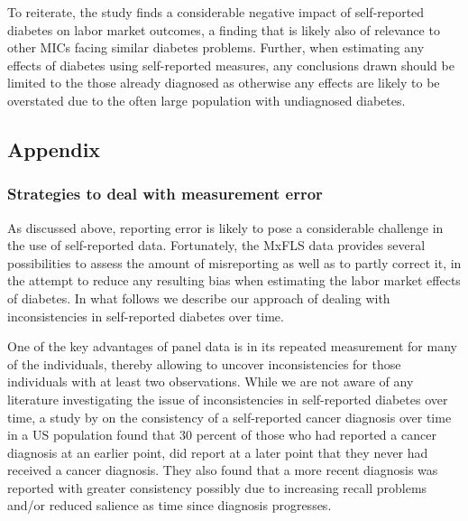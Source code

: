 \documentclass[12pt,english,british]{article}
\begin{document}
To reiterate, the study finds a considerable negative impact of self-reported diabetes on labor market outcomes, a finding that is likely also of relevance to other \ac{MICs} facing similar diabetes problems. Further, when estimating any effects of diabetes using self-reported measures, any conclusions drawn should be limited to the those already diagnosed as otherwise any effects are likely to be overstated due to the often large population with undiagnosed diabetes.


\begin{appendix}
\clearpage


\part*{Appendix}

\section{Strategies to deal with measurement error}

As discussed above, reporting error is likely to pose a considerable
challenge in the use of self-reported data. Fortunately, the \ac{MxFLS}
data provides several possibilities to assess the amount of misreporting
as well as to partly correct it, in the attempt to reduce any resulting
bias when estimating the labor market effects of diabetes. In what
follows we describe our approach of dealing with inconsistencies in
self-reported diabetes over time.

One of the key advantages of panel data is in its repeated measurement
for many of the individuals, thereby allowing to uncover inconsistencies
for those individuals with at least two observations. While we are
not aware of any literature investigating the issue of inconsistencies
in self-reported diabetes over time, a study by \citet{Zajacova2010}
on the consistency of a self-reported cancer diagnosis over time in
a US population found that 30 percent of those who had reported a
cancer diagnosis at an earlier point, did report at a later point
that they never had received a cancer diagnosis. They also found that
a more recent diagnosis was reported with greater consistency possibly
due to increasing recall problems and/or reduced salience as time
since diagnosis progresses.


\end{appendix}
\end{document}
